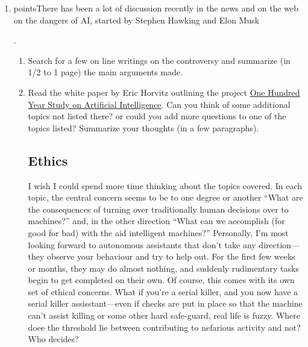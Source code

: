 \documentclass[11pt]{article}  %
\begin{document}
\begin{enumerate}
\begin{enumerate}
{    }
    
    
    \end{enumerate}
    \item {} points\rbrack There has been a lot of discussion recently
    in the news and on the web on the dangers of AI, started by Stephen Hawking and Elon
    Musk
    \par.
    \begin{enumerate}
    \item Search for a few on line writings on the controversy and summarize (in
    1/2 to 1 page) the main arguments made.
    \item Read the white paper by Eric Horvitz outlining the project
    \href{https://stanford.app.box.com/s/266hrhww2l3gjoy9euar}{One Hundred Year Study on Artificial Intelligence}.
    Can you think of some additional topics not listed there? or could you add more
    questions to one of the topics listed? Summarize your thoughts (in a few
    paragraphs).
    \par
    \subsection{Ethics}
    I wish I could spend more time thinking about the topics covered.  In each
    topic, the central concern seems to be to one degree or another ``What are
    the consequences of turning over traditionally human decisions over to
    machines?'' and, in the other direction ``What can we
    accomplish (for good for bad) with the aid intelligent machines?'' 
    Personally, I'm most looking forward to autonomous assistants that don't
    take any direction---they observe your behaviour and try to help out.  For
    the first few weeks or months, they may do almost nothing, and suddenly
    rudimentary tasks begin to get completed on their own.  Of course, this
    comes with its own set of ethical concerns.  What if you're a serial killer,
    and you now have a serial killer assisstant---even if checks are put in
    place so that the machine can't assist killing or some other hard safe-guard, 
    real life is fuzzy.  Where doee the threshold lie between contributing to 
    nefarious activity and not?  Who decides?   


\end{enumerate}
\end{enumerate}
\end{document}
